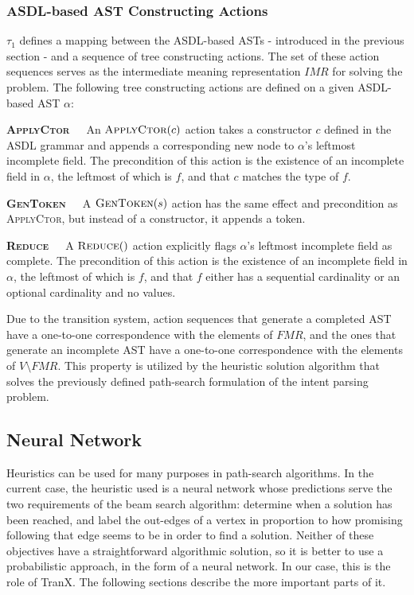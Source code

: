 \subsubsection{ASDL-based AST Constructing Actions}

\(\tau_{1}\) defines a mapping between the ASDL-based ASTs - introduced in the
previous section - and a sequence of tree constructing actions. The set of
these action sequences serves as the intermediate meaning representation
\(IMR\) for solving the problem. The following tree constructing actions
are defined on a given ASDL-based AST \(\alpha\):

\textbf{\textsc{ApplyCtor}}\ \ \ An \(\textsc{ApplyCtor}(c)\) action takes
a constructor \(c\) defined in the ASDL grammar and appends a corresponding
new node to \(\alpha\)'s leftmost incomplete field. The precondition of this
action is the existence of an incomplete field in \(\alpha\), the leftmost
of which is \(f\), and that \(c\) matches the type of \(f\).

\textbf{\textsc{GenToken}}\ \ \ A \(\textsc{GenToken}(s)\) action has the
same effect and precondition as \textsc{ApplyCtor}, but instead of a
constructor, it appends a token.

\textbf{\textsc{Reduce}}\ \ \ A \(\textsc{Reduce}()\) action explicitly
flags \(\alpha\)'s leftmost incomplete field as complete. The precondition
of this action is the existence of an incomplete field in \(\alpha\),
the leftmost of which is \(f\), and that \(f\) either has a sequential
cardinality or an optional cardinality and no values.

Due to the transition system, action sequences that generate a completed
AST have a one-to-one correspondence with the elements of \(FMR\),
and the ones that generate an incomplete AST have a one-to-one correspondence
with the elements of \(V \setminus FMR\). This property is utilized by the
heuristic solution algorithm that solves the previously defined path-search
formulation of the intent parsing problem.

\subsection{Neural Network}

Heuristics can be used for many purposes in path-search algorithms. In the current
case, the heuristic used is a neural network whose predictions serve the two
requirements of the beam search algorithm: determine when a solution has been
reached, and label the out-edges of a vertex in proportion to how promising
following that edge seems to be in order to find a solution. Neither of these
objectives have a straightforward algorithmic solution, so it is better
to use a probabilistic approach, in the form of a neural network. In our case, 
this is the role of TranX. The following sections describe the more important
parts of it.

